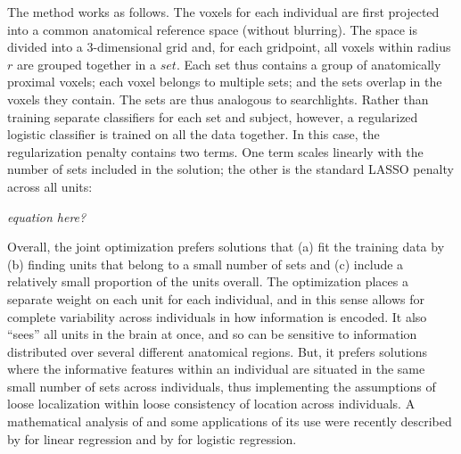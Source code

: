 The method works as follows. The voxels for each individual are first projected into a common anatomical reference space (without blurring). The space is divided into a 3-dimensional grid and, for each gridpoint, all voxels within radius $r$ are grouped together in a $set$. Each set thus contains a group of anatomically proximal voxels; each voxel belongs to multiple sets; and the sets overlap in the voxels they contain. The sets are thus analogous to searchlights. Rather than training separate classifiers for each set and subject, however, a regularized logistic classifier is trained on all the data together. In this case, the regularization penalty contains two terms. One term scales linearly with the number of sets included in the solution; the other is the standard LASSO penalty across all units:

{\em equation here?}

Overall, the joint optimization prefers solutions that (a) fit the training data by (b) finding units that belong to a small number of sets and (c) include a relatively small proportion of the units overall. The optimization places a separate weight on each unit for each individual, and in this sense allows for complete variability across individuals in how information is encoded. It also ``sees'' all units in the brain at once, and so can be sensitive to information distributed over several different anatomical regions. But, it prefers solutions where the informative features within an individual are situated in the same small number of sets across individuals, thus implementing the assumptions of loose localization within loose consistency of location across individuals. A mathematical analysis of \soslasso and some applications of its use were recently described by \cite{RaoNIPS} for linear regression and by \cite{RaoML} for logistic regression. 

